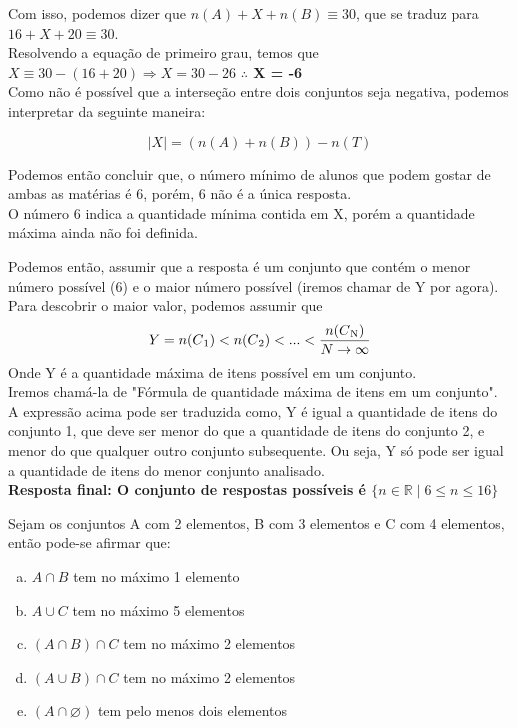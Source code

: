 \begin{solution}{}{}
    Com isso, podemos dizer que $n(A) + X + n(B) \equiv 30$, que se traduz para $16 + X + 20 \equiv 30$. \\
    Resolvendo a equação de primeiro grau, temos que \\ $X \equiv 30 - (16 + 20) \Rightarrow X = 30-26$ \textbf{$\therefore$ X = -6} \\

    Como não é possível que a interseção entre dois conjuntos seja negativa, podemos interpretar da seguinte maneira:
    
        \[\mid X\mid = (n(A) + n(B)) - n(T)\]

    Podemos então concluir que, o número mínimo de alunos que podem gostar de ambas as matérias é 6, porém, 6 não é a única resposta. \\ 
    O número 6 indica a quantidade mínima contida em X, porém a quantidade máxima ainda não foi definida.

    Podemos então, assumir que a resposta é um conjunto que contém o menor número possível (6) e o maior número possível (iremos chamar de Y por agora).\\
    Para descobrir o maior valor, podemos assumir que
        \[Y = n(C\textsubscript{1}) < n(C\textsubscript{2}) < ... <   \frac{n(C\textsubscript{N})}{N\rightarrow \infty} \]
    Onde Y é a quantidade máxima de itens possível em um conjunto.\\ 
    Iremos chamá-la de "Fórmula de quantidade máxima de itens em um conjunto". \\
    A expressão acima pode ser traduzida como, Y é igual a quantidade de itens do conjunto 1, que deve ser menor do que a quantidade de itens do conjunto 2, e menor do que qualquer outro conjunto subsequente. Ou seja, Y só pode ser igual a quantidade de itens do menor conjunto analisado. \\

    \textbf{Resposta final: O conjunto de respostas possíveis é $\{{n \in \mathbb{R} \mid 6 \leq n \leq 16}\}$}
    
    
\end{solution}

\begin{problem}{}{}   
    Sejam os conjuntos A com 2 elementos, B com 3 elementos e C com 4 elementos, então
    pode-se afirmar que:
    \begin{enumerate}[(a)]
        \item $A\cap B$ tem no máximo 1 elemento
        \item $A \cup C$ tem no máximo 5 elementos
        \item $(A \cap B) \cap C$ tem no máximo 2 elementos
        \item $(A \cup B) \cap C$ tem no máximo 2 elementos
        \item $(A \cap \varnothing)$ tem pelo menos dois elementos
    \end{enumerate}
\end{problem}

